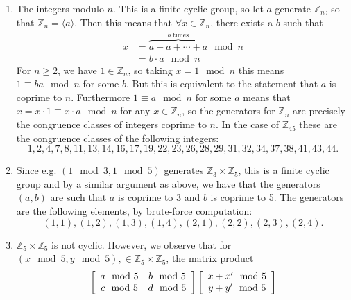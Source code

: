 \documentclass{article}
\begin{document}
\begin{Answer}
\begin{enumerate}
  \item{The integers modulo $n$. This is a finite cyclic group, so let
        $a$ generate $\mathbb{Z}_n$, so
        that $\mathbb{Z}_n = \langle a \rangle$. Then this means that
        $\forall x \in \mathbb{Z}_n$, there exists a $b$ such that
       \begin{align*}
        x
        &=
          \overbrace{a + a + \cdots + a}^{b \text{ times}} \mod n \\
        &=
          b \cdot a \mod n
        \end{align*}
        For $n \geq 2$, we have $1 \in \mathbb{Z}_n$, so taking $x =
        1 \mod n$ this means
        $1 \equiv b a \mod n$ for some $b$. But this is equivalent to
        the statement that $a$ is coprime to $n$. Furthermore
        $1 \equiv a \mod n$ for some $a$ means that
        $x = x \cdot 1 \equiv x \cdot a \mod n$ for any
        $x \in \mathbb{Z}_n$, so the generators for $\mathbb{Z}_n$ are
        precisely the congruence classes of integers coprime to
        $n$. In the case of $\mathbb{Z}_{45}$ these are the congruence
        classes of the following integers:
        $$
        1, 2, 4, 7, 8, 11, 13, 14, 16, 17, 19, 22, 23, 26, 28, 29,
        31, 32, 34, 37, 38, 41, 43, 44.
        $$
      }
  \item{Since e.g. $(1 \mod 3, 1 \mod 5)$ generates
        $\mathbb{Z}_3 \times \mathbb{Z}_5$, this is a finite cyclic
        group and by a similar argument as above, we have that the
        generators $(a, b)$ are such that $a$ is coprime to 3 and
        $b$ is coprime to 5. The generators are the
        following elements, by brute-force computation:
        $$
        (1,1),(1,2),(1,3),(1,4),(2,1),(2,2),(2,3),(2,4).
        $$
       }
  \item{$\mathbb{Z}_5 \times \mathbb{Z}_5$ is not cyclic. However, we
        observe that for
        $(x \mod 5, y \mod 5),
        \in \mathbb{Z}_5 \times \mathbb{Z}_5$, the matrix product
        \begin{align*}
        &\left[\begin{array}{c c}
           a \mod 5 & b \mod 5 \\
           c \mod 5 & d \mod 5
         \end{array}\right]
         \left[\begin{array}{c}
           x + x^\prime \mod 5 \\ y + y^\prime \mod 5
         \end{array}\right] \\

\end{align*}}
\end{enumerate}
\end{Answer}
\end{document}

